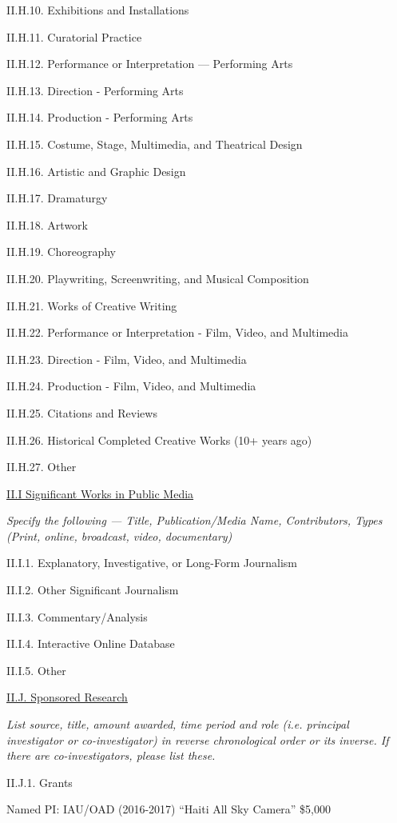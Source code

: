 \documentclass[11pt,letterpaper]{article}
\begin{document}
II.H.10. Exhibitions and Installations

II.H.11. Curatorial Practice

II.H.12. Performance or Interpretation --- Performing Arts

II.H.13. Direction - Performing Arts

II.H.14. Production - Performing Arts

II.H.15. Costume, Stage, Multimedia, and Theatrical Design

II.H.16. Artistic and Graphic Design

II.H.17. Dramaturgy

II.H.18. Artwork

II.H.19. Choreography

II.H.20. Playwriting, Screenwriting, and Musical Composition

II.H.21. Works of Creative Writing

II.H.22. Performance or Interpretation - Film, Video, and Multimedia

II.H.23. Direction - Film, Video, and Multimedia

II.H.24. Production - Film, Video, and Multimedia

II.H.25. Citations and Reviews

II.H.26. Historical Completed Creative Works (10+ years ago)

II.H.27. Other


\underline{II.I Significant Works in Public Media}

\textit{Specify the following --- Title, Publication/Media Name, Contributors, Types (Print, online, broadcast, video, documentary)}

II.I.1. Explanatory, Investigative, or Long-Form Journalism

II.I.2. Other Significant Journalism

II.I.3. Commentary/Analysis

II.I.4. Interactive Online Database

II.I.5. Other


\underline{II.J. Sponsored Research}

\textit{List source, title, amount awarded, time period and role (i.e. principal investigator or co-investigator) in reverse chronological order or its inverse.  If there are co-investigators, please list these.}

II.J.1. Grants

Named PI: IAU/OAD (2016-2017) ``Haiti All Sky Camera''
		\$5,000
\end{document}
